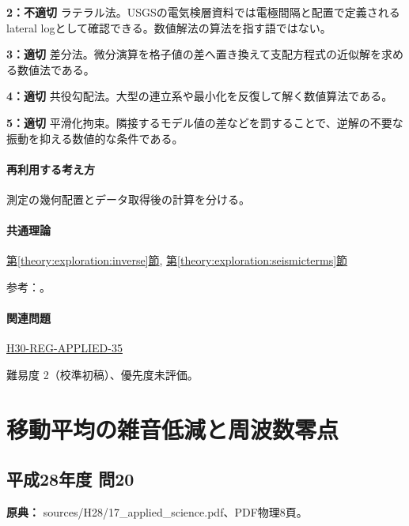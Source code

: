 \noindent\textbf{2：不適切} ラテラル法。USGSの電気検層資料では電極間隔と配置で定義されるlateral logとして確認できる。数値解法の算法を指す語ではない。\par

\noindent\textbf{3：適切} 差分法。微分演算を格子値の差へ置き換えて支配方程式の近似解を求める数値法である。\par

\noindent\textbf{4：適切} 共役勾配法。大型の連立系や最小化を反復して解く数値算法である。\par

\noindent\textbf{5：適切} 平滑化拘束。隣接するモデル値の差などを罰することで、逆解の不要な振動を抑える数値的な条件である。\par

\paragraph{再利用する考え方} 測定の幾何配置とデータ取得後の計算を分ける。

\paragraph{共通理論} \hyperref[theory:exploration:inverse]{第\ref*{theory:exploration:inverse}節}, \hyperref[theory:exploration:seismicterms]{第\ref*{theory:exploration:seismicterms}節}

\par 参考：\cite{usgs_lateral_logging,pygimli_inversion,mit_signals2010}。

\paragraph{関連問題} \hyperref[q:h30-reg-applied-35]{H30-REG-APPLIED-35}

\par 難易度 2（校準初稿）、優先度未評価。

\section{移動平均の雑音低減と周波数零点}

\subsection{平成28年度 問20}
\label{q:h28-reg-applied-20}

\noindent\textbf{原典：} sources/H28/17\_applied\_science.pdf、PDF物理8頁。

